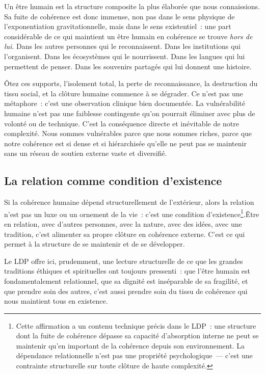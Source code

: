 \documentclass[12pt, a4paper, openright]{book}
\begin{document}
\medskip

Un être humain est la structure composite la plus élaborée que nous connaissions. Sa fuite de cohérence est donc immense, non pas dans le sens physique de l'exponentiation gravitationnelle, mais dans le sens existentiel~: une part considérable de ce qui maintient un être humain en cohérence se trouve \emph{hors de lui}. Dans les autres personnes qui le reconnaissent. Dans les institutions qui l'organisent. Dans les écosystèmes qui le nourrissent. Dans les langues qui lui permettent de penser. Dans les souvenirs partagés qui lui donnent une histoire.

\medskip

Ôtez ces supports, l'isolement total, la perte de reconnaissance, la destruction du tissu social, et la clôture humaine commence à se dégrader. Ce n'est pas une métaphore~: c'est une observation clinique bien documentée. La vulnérabilité humaine n'est pas une faiblesse contingente qu'on pourrait éliminer avec plus de volonté ou de technique. C'est la conséquence directe et inévitable de notre complexité. Nous sommes vulnérables parce que nous sommes riches, parce que notre cohérence est si dense et si hiérarchisée qu'elle ne peut pas se maintenir sans un réseau de soutien externe vaste et diversifié.

\subsection*{La relation comme condition d'existence}

Si la cohérence humaine dépend structurellement de l'extérieur, alors la relation n'est pas un luxe ou un ornement de la vie~: c'est une condition d'existence\footnote{Cette affirmation a un contenu technique précis dans le LDP~: une structure dont la fuite de cohérence dépasse sa capacité d'absorption interne ne peut se maintenir qu'en important de la cohérence depuis son environnement. La dépendance relationnelle n'est pas une propriété psychologique~--- c'est une contrainte structurelle sur toute clôture de haute complexité.}.Être en relation, avec d'autres personnes, avec la nature, avec des idées, avec une tradition, c'est alimenter sa propre clôture en cohérence externe. C'est ce qui permet à la structure de se maintenir et de se développer.

\medskip

Le LDP offre ici, prudemment, une lecture structurelle de ce que les grandes traditions éthiques et spirituelles ont toujours pressenti~: que l'être humain est fondamentalement relationnel, que sa dignité est inséparable de sa fragilité, et que prendre soin des autres, c'est aussi prendre soin du tissu de cohérence qui nous maintient tous en existence.
\end{document}
